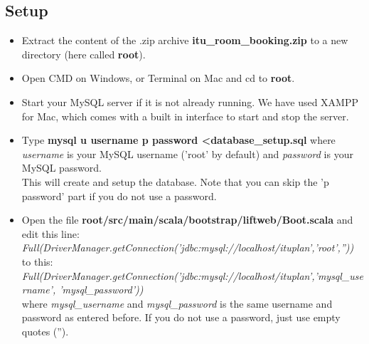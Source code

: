 \subsection{Setup}
\begin{itemize}
	\item Extract the content of the .zip archive \textbf{itu\_room\_booking.zip} to a new directory (here called \textbf{root}).
	\item Open CMD on Windows, or Terminal on Mac and cd to \textbf{root}.
	\item Start your MySQL server if it is not already running. We have used XAMPP for Mac, which comes with a built in interface to start and stop the server.
	\item Type \textbf{mysql  \textendash u username \textendash p password \textless  database\_setup.sql} where \emph{username} is your MySQL username ('root' by default) and \emph{password} is your MySQL password.\\ This will create and setup the database. Note that you can skip the '\textendash p password' part if you do not use a password.
	\item Open the file \textbf{root/src/main/scala/bootstrap/liftweb/Boot.scala} and edit this line:\\
	
	\emph{Full(DriverManager.getConnection('jdbc:mysql://localhost/ituplan','root',''))} \\
	
	to this:\\
	
\emph{Full(DriverManager.getConnection('jdbc:mysql://localhost/ituplan','mysql\_username', 'mysql\_password'))}\\

where \emph{mysql\_username} and \emph{mysql\_password} is the same username and password as entered before. If you do not use a password, just use empty quotes ('').
\end{itemize}

